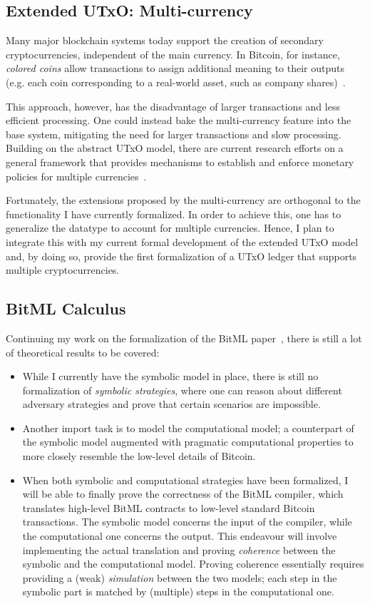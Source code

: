 \documentclass[acmsmall,nonacm=true,screen=true]{acmart}
\begin{document}
\subsection{Extended UTxO: Multi-currency}
Many major blockchain systems today support the creation of secondary cryptocurrencies, independent of the main  currency.
In Bitcoin, for instance, \textit{colored coins} allow transactions to assign additional meaning to their outputs
(e.g. each coin corresponding to a real-world asset, such as company shares)~\cite{coloredcoins}.

This approach, however, has the disadvantage of larger transactions and less efficient processing.
One could instead bake the multi-currency feature into the base system, mitigating the need for
larger transactions and slow processing.
Building on the abstract UTxO model, there are current research efforts on a general framework that provides mechanisms
to establish and enforce monetary policies for multiple currencies~\cite{multicurrency}.

Fortunately, the extensions proposed by the multi-currency are orthogonal to the functionality I have currently formalized.
In order to achieve this, one has to generalize the \inlineValue{} datatype to account for multiple currencies.
Hence, I plan to integrate this with my current formal development of the extended UTxO model and,
by doing so, provide the first formalization of a UTxO ledger that supports multiple cryptocurrencies.

\subsection{BitML Calculus}
Continuing my work on the formalization of the BitML paper~\cite{bitml},
there is still a lot of theoretical results to be covered:
\begin{itemize}
\item While I currently have the symbolic model in place, there is still no formalization of \textit{symbolic strategies},
where one can reason about different adversary strategies and prove that certain scenarios are impossible.
\item Another import task is to model the computational model; a counterpart of the symbolic model augmented
with pragmatic computational properties to more closely resemble the low-level details of Bitcoin.
\item When both symbolic and computational strategies have been formalized, I will be able to finally
prove the correctness of the BitML compiler, which translates high-level BitML contracts to
low-level standard Bitcoin transactions. The symbolic model concerns the input of the compiler, while
the computational one concerns the output.
This endeavour will involve implementing the actual translation and proving \textit{coherence} between the
symbolic and the computational model.
Proving coherence essentially requires providing a (weak) \textit{simulation} between the two models;
each step in the symbolic part is matched by (multiple) steps in the computational one.
\end{itemize}
\end{document}
